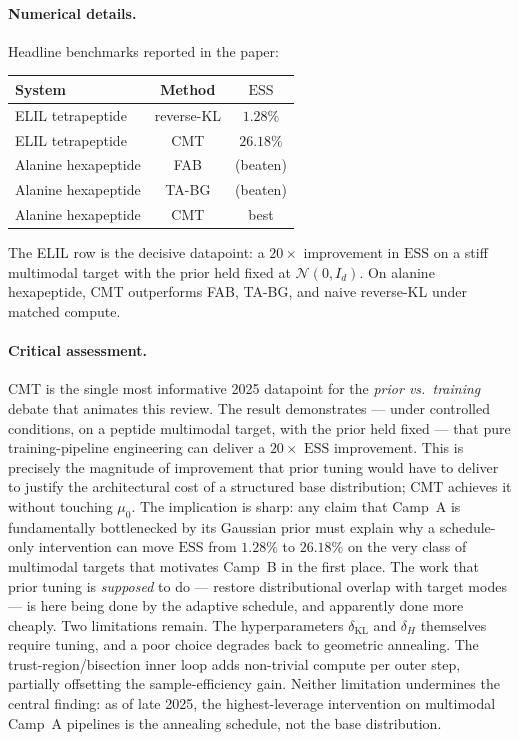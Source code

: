 \documentclass[11pt,letterpaper]{article}
\newcommand{\ESS}{\mathrm{ESS}}
\theoremstyle{plain}
\begin{document}
\paragraph{Numerical details.} Headline benchmarks reported in the paper:
\begin{center}\small
\begin{tabular}{lcc}
\toprule
System & Method & $\ESS$ \\
\midrule
ELIL tetrapeptide   & reverse-KL & $1.28\%$ \\
ELIL tetrapeptide   & CMT        & $\mathbf{26.18\%}$ \\
Alanine hexapeptide & FAB        & (beaten) \\
Alanine hexapeptide & TA-BG      & (beaten) \\
Alanine hexapeptide & CMT        & best \\
\bottomrule
\end{tabular}
\end{center}
The ELIL row is the decisive datapoint: a $20\times$ improvement in $\ESS$
on a stiff multimodal target with the prior held fixed at
$\mathcal N(0,I_d)$. On alanine hexapeptide, CMT outperforms FAB, TA-BG,
and naive reverse-KL under matched compute.

\paragraph{Critical assessment.} CMT is the single most informative 2025
datapoint for the \emph{prior vs.\ training} debate that animates this
review. The result demonstrates --- under controlled conditions, on a
peptide multimodal target, with the prior held fixed --- that pure
training-pipeline engineering can deliver a $20\times$ $\ESS$ improvement.
This is precisely the magnitude of improvement that prior tuning would have
to deliver to justify the architectural cost of a structured base
distribution; CMT achieves it without touching $\mu_0$. The implication is
sharp: any claim that Camp~A is fundamentally bottlenecked by its Gaussian
prior must explain why a schedule-only intervention can move $\ESS$ from
$1.28\%$ to $26.18\%$ on the very class of multimodal targets that
motivates Camp~B in the first place. The work that prior tuning is
\emph{supposed} to do --- restore distributional overlap with target modes
--- is here being done by the adaptive schedule, and apparently done more
cheaply. Two limitations remain. The hyperparameters $\delta_{\mathrm{KL}}$
and $\delta_H$ themselves require tuning, and a poor choice degrades back
to geometric annealing. The trust-region/bisection inner loop adds
non-trivial compute per outer step, partially offsetting the
sample-efficiency gain. Neither limitation undermines the central finding:
as of late 2025, the highest-leverage intervention on multimodal Camp~A
pipelines is the annealing schedule, not the base distribution.
\end{document}
